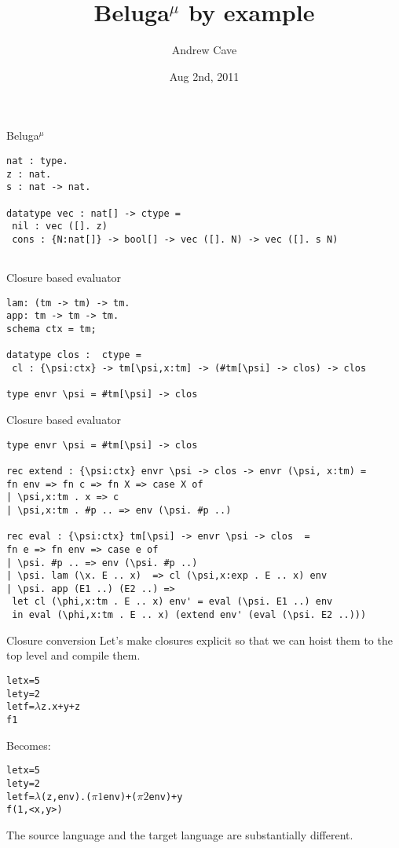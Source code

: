 \documentclass{beamer}
\title[]{Beluga$^\mu$ by example}
\author{Andrew Cave}
\date{Aug 2nd, 2011}
\begin{document}
\begin{frame}
\titlepage
\end{frame}

\begin{frame}[fragile]{Beluga$^\mu$}
\begin{lstlisting}
nat : type.
z : nat.
s : nat -> nat.

datatype vec : nat[] -> ctype =
 nil : vec ([]. z)
 cons : {N:nat[]} -> bool[] -> vec ([]. N) -> vec ([]. s N)
 
\end{lstlisting}
\end{frame}

\begin{frame}[fragile]{Closure based evaluator}
\begin{lstlisting}
lam: (tm -> tm) -> tm.              
app: tm -> tm -> tm.
schema ctx = tm;

datatype clos :  ctype =
 cl : {\psi:ctx} -> tm[\psi,x:tm] -> (#tm[\psi] -> clos) -> clos

type envr \psi = #tm[\psi] -> clos
\end{lstlisting}
\end{frame}

\begin{frame}[fragile]{Closure based evaluator}
\begin{lstlisting}
type envr \psi = #tm[\psi] -> clos

rec extend : {\psi:ctx} envr \psi -> clos -> envr (\psi, x:tm) =
fn env => fn c => fn X => case X of
| \psi,x:tm . x => c
| \psi,x:tm . #p .. => env (\psi. #p ..)

rec eval : {\psi:ctx} tm[\psi] -> envr \psi -> clos  =
fn e => fn env => case e of
| \psi. #p .. => env (\psi. #p ..)
| \psi. lam (\x. E .. x)  => cl (\psi,x:exp . E .. x) env
| \psi. app (E1 ..) (E2 ..) =>
 let cl (\phi,x:tm . E .. x) env' = eval (\psi. E1 ..) env
 in eval (\phi,x:tm . E .. x) (extend env' (eval (\psi. E2 ..)))
\end{lstlisting}
\end{frame}

\begin{frame}[fragile]{Closure conversion}
Let's make closures explicit so that we can hoist them to the top level and compile them.

\begin{alltt}
let x = 5
let y = 2
let f = \(\lambda\) z. x + y + z
  f 1
\end{alltt}

Becomes:

\begin{alltt}
let x = 5
let y = 2
let f = \(\lambda\) (z,env). (\(\pi1\) env) + (\(\pi2\) env) + y
  f (1, < x, y >)
\end{alltt}

The source language and the target language are substantially different.
\end{frame}
\end{document}
